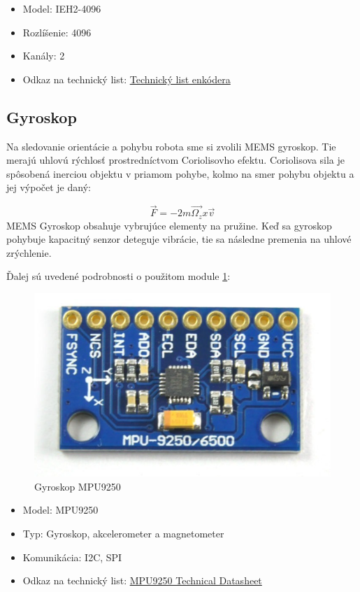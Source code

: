 \begin{itemize}
  \item Model: IEH2-4096
  \item Rozlíšenie: 4096
  \item Kanály: 2
  \item Odkaz na technický list: \href{https://www.faulhaber.com/fileadmin/Import/Media/EN_IEH2-4096_DFF.pdf}{Technický list enkódera}
\end{itemize}

\subsection{Gyroskop}

Na sledovanie orientácie a pohybu robota sme si zvolili MEMS gyroskop. Tie merajú uhlovú rýchlosť prostredníctvom Coriolisovho efektu. Coriolisova sila je spôsobená inerciou objektu v priamom pohybe, kolmo na smer pohybu objektu a jej výpočet je daný: 

\begin{equation}
\label{enc_eq}
\vec{F} = -2m\vec{\Omega_z}x\vec{v}
\end{equation}
MEMS Gyroskop obsahuje vybrujúce elementy na pružine. Keď sa gyroskop pohybuje kapacitný senzor deteguje vibrácie, tie sa následne premenia na uhlové zrýchlenie.
    
Ďalej sú uvedené podrobnosti o použitom module \ref{fig:gyro}:
\begin{figure}[!htbp]
        \centering
        \includegraphics[scale=0.8]{includes/images/mpu9205.png}
        \caption{Gyroskop MPU9250}
        \label{fig:gyro}
\end{figure}
\begin{itemize}
  \item Model: MPU9250
  \item Typ: Gyroskop, akcelerometer a magnetometer
  \item Komunikácia: I2C, SPI
  \item Odkaz na technický list: \href{https://www.invensense.com/products/motion-tracking/9-axis/mpu-9250/}{MPU9250 Technical Datasheet}
\end{itemize}
